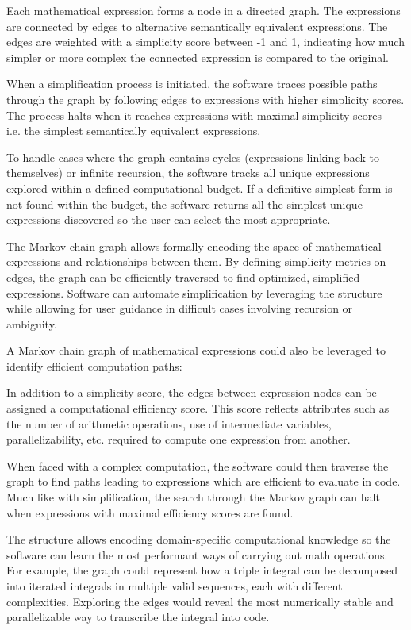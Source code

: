\documentclass[9pt,a4paper,twocolumn]{article}
\newcounter{def}
\begin{document}
                Each mathematical expression forms a node in a directed graph. The expressions are connected by edges to alternative semantically equivalent expressions. The edges are weighted with a simplicity score between -1 and 1, indicating how much simpler or more complex the connected expression is compared to the original.

                When a simplification process is initiated, the software traces possible paths through the graph by following edges to expressions with higher simplicity scores. The process halts when it reaches expressions with maximal simplicity scores - i.e. the simplest semantically equivalent expressions.

                To handle cases where the graph contains cycles (expressions linking back to themselves) or infinite recursion, the software tracks all unique expressions explored within a defined computational budget. If a definitive simplest form is not found within the budget, the software returns all the simplest unique expressions discovered so the user can select the most appropriate.

                The Markov chain graph allows formally encoding the space of mathematical expressions and relationships between them. By defining simplicity metrics on edges, the graph can be efficiently traversed to find optimized, simplified expressions. Software can automate simplification by leveraging the structure while allowing for user guidance in difficult cases involving recursion or ambiguity.

                A Markov chain graph of mathematical expressions could also be leveraged to identify efficient computation paths:

                In addition to a simplicity score, the edges between expression nodes can be assigned a computational efficiency score. This score reflects attributes such as the number of arithmetic operations, use of intermediate variables, parallelizability, etc. required to compute one expression from another.

                When faced with a complex computation, the software could then traverse the graph to find paths leading to expressions which are efficient to evaluate in code. Much like with simplification, the search through the Markov graph can halt when expressions with maximal efficiency scores are found.

                The structure allows encoding domain-specific computational knowledge so the software can learn the most performant ways of carrying out math operations. For example, the graph could represent how a triple integral can be decomposed into iterated integrals in multiple valid sequences, each with different complexities. Exploring the edges would reveal the most numerically stable and parallelizable way to transcribe the integral into code.
\end{document}
